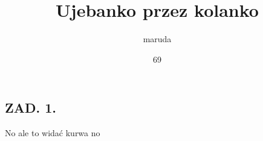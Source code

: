 \documentclass{article}[16pt]
\title{Ujebanko przez kolanko}
\date{69}
\author{maruda}
\begin{document}
\maketitle

\subsection*{ZAD. 1.}
No ale to widać kurwa no
\end{document}
